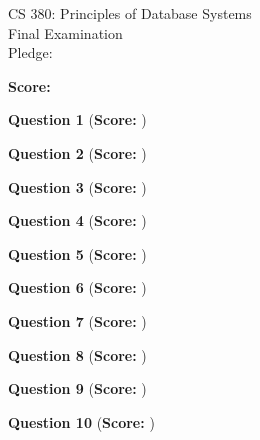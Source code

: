 \documentclass[epsf,psfig, 12pt]{article}
\begin{document}
\pagestyle{empty}


\vspace*{3in}

\begin{center}

CS 380: Principles of Database Systems \\
Final Examination \\
Pledge: \\

\vspace*{1in}

{\large 

{\bf Score:} \underline{\hspace*{.2in}} \hspace*{.05in}

}

\end{center}

\newpage

{\bf Question 1} ({\bf Score:} \underline{\hspace*{.2in}} \hspace*{.05in})

\newpage

{\bf Question 2} ({\bf Score:} \underline{\hspace*{.2in}} \hspace*{.05in})

\newpage

{\bf Question 3} ({\bf Score:} \underline{\hspace*{.2in}} \hspace*{.05in})

\newpage

{\bf Question 4} ({\bf Score:} \underline{\hspace*{.2in}} \hspace*{.05in})

\newpage

{\bf Question 5} ({\bf Score:} \underline{\hspace*{.2in}} \hspace*{.05in})

\newpage

{\bf Question 6} ({\bf Score:} \underline{\hspace*{.2in}} \hspace*{.05in})

\newpage

{\bf Question 7} ({\bf Score:} \underline{\hspace*{.2in}} \hspace*{.05in})

\newpage

{\bf Question 8} ({\bf Score:} \underline{\hspace*{.2in}} \hspace*{.05in})

\newpage

{\bf Question 9} ({\bf Score:} \underline{\hspace*{.2in}} \hspace*{.05in})

\newpage

{\bf Question 10} ({\bf Score:} \underline{\hspace*{.2in}} \hspace*{.05in})

\newpage
\end{document}
